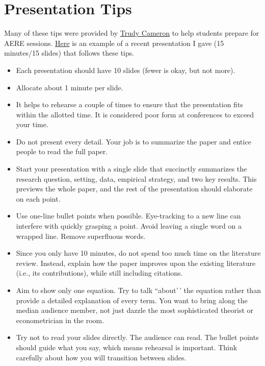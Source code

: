 \documentclass[
]{article}
\providecommand{\tightlist}{%
  \setlength{\itemsep}{0pt}\setlength{\parskip}{0pt}}
\begin{document}
\hypertarget{presentation-tips}{%
\section{Presentation Tips}\label{presentation-tips}}

Many of these tips were provided by \href{https://pages.uoregon.edu/cameron/vita/}{Trudy Cameron} to help students prepare for AERE sessions. \href{https://www.raahilmadhok.com/pdf/fra_slides.pdf}{Here} is an example of a recent presentation I gave (15 minutes/15 slides) that follows these tips.

\begin{itemize}
\tightlist
\item
  Each presentation should have 10 slides (fewer is okay, but not more).
\item
  Allocate about 1 minute per slide.
\item
  It helps to rehearse a couple of times to ensure that the presentation fits within the allotted time. It is considered poor form at conferences to exceed your time.
\item
  Do not present every detail. Your job is to summarize the paper and entice people to read the full paper.
\item
  Start your presentation with a single slide that succinctly summarizes the research question, setting, data, empirical strategy, and two key results. This previews the whole paper, and the rest of the presentation should elaborate on each point.
\item
  Use one-line bullet points when possible. Eye-tracking to a new line can interfere with quickly grasping a point. Avoid leaving a single word on a wrapped line. Remove superfluous words.
\item
  Since you only have 10 minutes, do not spend too much time on the literature review. Instead, explain how the paper improves upon the existing literature (i.e., its contributions), while still including citations.
\item
  Aim to show only one equation. Try to talk ``about'\,' the equation rather than provide a detailed explanation of every term. You want to bring along the median audience member, not just dazzle the most sophisticated theorist or econometrician in the room.
\item
  Try not to read your slides directly. The audience can read. The bullet points should guide what you say, which means rehearsal is important. Think carefully about how you will transition between slides.
\end{itemize}
\end{document}
